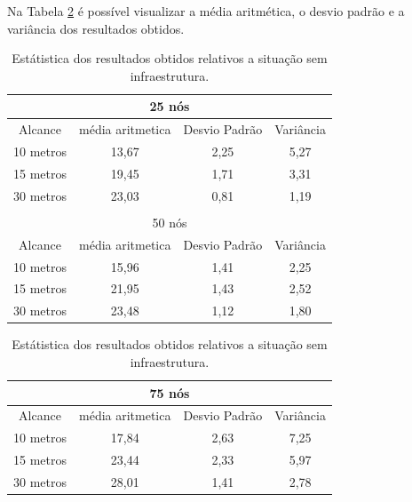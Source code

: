 	Na Tabela \ref{tab:estatiscaResultadosObtidosSemInfraestrutura} é possível visualizar a média aritmética, o desvio padrão e a variância dos resultados obtidos. 

	\begin{table}[!htb]
	    \caption{Estátistica dos resultados obtidos relativos a situação sem infraestrutura.}
	    \label{tab:estatiscaResultadosObtidosSemInfraestrutura}
	    \centering
	    \tiny
	    \begin{minipage}{.5\linewidth}
	      
	      \centering
	        \begin{tabular}{|c|c|c|c|}

			\hline
			\multicolumn{4}{|c|}{25 nós} \\ \hline
			Alcance   & média aritmetica &	Desvio Padrão &	Variância  \\ \hline
			10 metros &	13,67 & 2,25 &	5,27  \\ \hline
			15 metros &	19,45 & 1,71 &	3,31  \\ \hline
			30 metros &	23,03 & 0,81 &	1,19 \\ \hline

			\multicolumn{4}{|c|}{} \\ \hline

			\multicolumn{4}{|c|}{50 nós} \\ \hline
			Alcance   & média aritmetica &	Desvio Padrão &	Variância  \\ \hline
			10 metros &	15,96	& 1,41 & 2,25  \\ \hline
			15 metros &	21,95	& 1,43 & 2,52  \\ \hline
			30 metros &	23,48	& 1,12 & 1,80 \\ \hline

		\end{tabular}
	    \end{minipage}%
	    \begin{minipage}{.5\linewidth}
	      \centering
	        \begin{tabular}{|c|c|c|c|}
	        \hline
			\multicolumn{4}{|c|}{75 nós} \\ \hline
			Alcance   & média aritmetica &	Desvio Padrão &	Variância  \\ \hline
			10 metros &	17,84 & 2,63 & 7,25  \\ \hline
			15 metros &	23,44 & 2,33 & 5,97  \\ \hline
			30 metros &	28,01 & 1,41 & 2,78 \\ \hline


\end{tabular}
\end{minipage}
\end{table}
